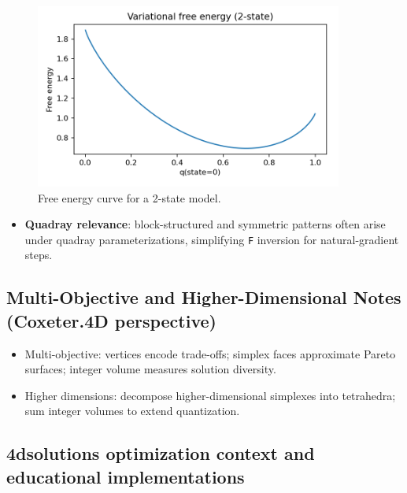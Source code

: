 \documentclass[
  10pt,
]{article}
\providecommand{\tightlist}{%
  \setlength{\itemsep}{0pt}\setlength{\parskip}{0pt}}
\begin{document}
\begin{figure}[htbp]
\centering
\includegraphics[width=0.9\textwidth]{figures/free_energy_curve.png}
\caption{Free energy curve for a 2-state model.}
\label{fig:free_energy_curve}
\end{figure}

\begin{itemize}
\tightlist
\item
  \textbf{Quadray relevance}: block-structured and symmetric patterns
  often arise under quadray parameterizations, simplifying \texttt{F}
  inversion for natural-gradient steps.
\end{itemize}

\hypertarget{multi-objective-and-higher-dimensional-notes-coxeter.4d-perspective}{%
\subsection{Multi-Objective and Higher-Dimensional Notes (Coxeter.4D
perspective)}\label{multi-objective-and-higher-dimensional-notes-coxeter.4d-perspective}}

\begin{itemize}
\tightlist
\item
  Multi-objective: vertices encode trade-offs; simplex faces approximate
  Pareto surfaces; integer volume measures solution diversity.
\item
  Higher dimensions: decompose higher-dimensional simplexes into
  tetrahedra; sum integer volumes to extend quantization.
\end{itemize}

\hypertarget{dsolutions-optimization-context-and-educational-implementations}{%
\subsection{4dsolutions optimization context and educational
implementations}\label{dsolutions-optimization-context-and-educational-implementations}}
\end{document}
